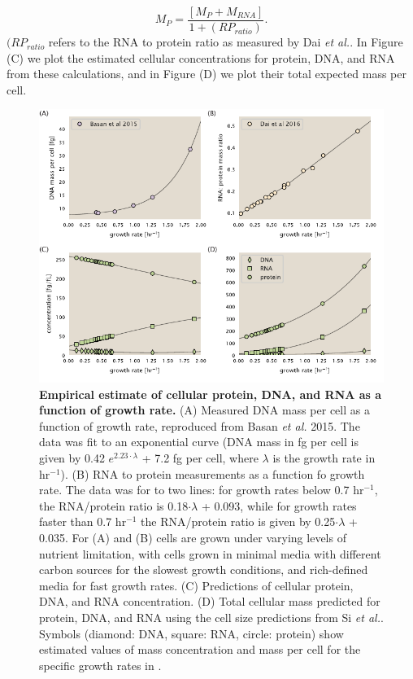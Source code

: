 \begin{equation}
	M_{P} = \frac{[M_P + M_{RNA}]}{1 + (RP_{ratio})}.
\end{equation}
$(RP_{ratio}$ refers to the RNA to protein ratio as measured by Dai \textit{et
al.}. In Figure (C) we plot the
estimated cellular concentrations for protein, DNA, and RNA from these
calculations, and in Figure (D) we plot
their total expected mass per cell.


\begin{figure}
		\centering
    \includegraphics[width=1\textwidth]{SI_figs/schmidt_estimate_protein_RNA_DNA_corrections.pdf}
  \caption{{\bf Empirical estimate of cellular protein, DNA, and RNA as a
  function of growth rate.} (A) Measured DNA mass per cell as a function of
  growth rate, reproduced from Basan \textit{et al.} 2015. The data was fit to
  an exponential curve (DNA mass in fg per cell is given by 0.42 $e^{2.23 \cdot
  \lambda}$ + 7.2 fg per cell, where $\lambda$ is the growth rate in hr$^{-1}$).
  (B) RNA to protein measurements as a function fo growth rate. The data was for
  to two lines: for growth rates below 0.7 hr$^{-1}$, the RNA/protein ratio is
  0.18$\cdot \lambda$ + 0.093, while for growth rates faster than 0.7 hr$^{-1}$
  the RNA/protein ratio is given by 0.25$\cdot \lambda$ + 0.035. For (A) and (B)
  cells are grown under varying levels of nutrient limitation, with cells grown
  in minimal media with different carbon sources for the slowest growth
  conditions, and rich-defined media for fast growth rates. (C) Predictions of
  cellular protein, DNA, and RNA concentration.  (D) Total cellular mass
  predicted for protein, DNA, and RNA using the cell size predictions from Si
  \textit{et al.}. Symbols (diamond: DNA, square: RNA, circle: protein)
	show estimated values of mass concentration and mass per cell for the specific
	growth rates in \cite{schmidt_2016}.
	 	}
  \label{fig:schmidt_adjustment_varying_conc}
\end{figure}



